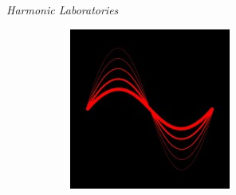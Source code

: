\begin{titlepage}
    \makeatletter


    \LARGE
    \textbf{\@title}



    
    \textsl{Harmonic Laboratories}

    \begin{figure}
        \centering
        \begin{subfigure}[b]{0.3\textwidth}
            \includegraphics[width=\textwidth]{assets/hlabs_logo}
        \end{subfigure}
    \end{figure}

    \makeatother
\end{titlepage}
